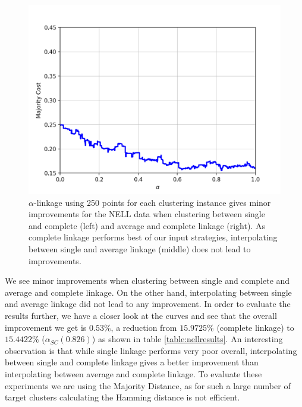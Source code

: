 \begin{figure}[h]
\begin{minipage}{.3\textwidth}
  \includegraphics[width=\linewidth]{plots/nell_ac}
\end{minipage}
\caption{$\alpha$-linkage using 250 points for each clustering instance gives minor improvements for the NELL data when clustering between single and complete (left) and average and complete linkage (right). As complete linkage performs best of our input strategies, interpolating between single and average linkage (middle) does not lead to improvements.}
\label{fig:nellresults}
\end{figure}

We see minor improvements when clustering between single and complete and average and complete linkage. On the other hand, interpolating between single and average linkage did not lead to any improvement. In order to evaluate the results further, we have a closer look at the curves and see that the overall improvement we get is $0.53\%$, a reduction from $15.9725\%$ (complete linkage) to $15.4422\%$ ($\alpha_{SC}(0.826)$) as shown in table \ref{table:nellresults}. An interesting observation is that while single linkage performs very poor overall, interpolating between single and complete linkage gives a better improvement than interpolating between average and complete linkage. To evaluate these experiments we are using the Majority Distance, as for such a large number of target clusters calculating the Hamming distance is not efficient. 


